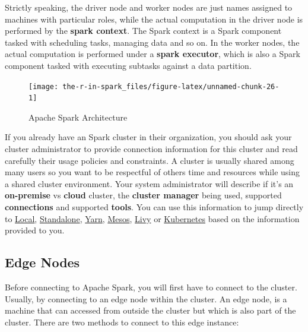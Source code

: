 \documentclass[]{book}
\theoremstyle{definition}
\theoremstyle{definition}
\theoremstyle{definition}
\theoremstyle{remark}
\begin{document}
Strictly speaking, the driver node and worker nodes are just names
assigned to machines with particular roles, while the actual computation
in the driver node is performed by the \textbf{spark context}. The Spark
context is a Spark component tasked with scheduling tasks, managing data
and so on. In the worker nodes, the actual computation is performed
under a \textbf{spark executor}, which is also a Spark component tasked
with executing subtasks against a data partition.

\begin{figure}

{\centering \texttt{[image: the-r-in-spark\_files/figure-latex/unnamed-chunk-26-1]} 

}

\caption{Apache Spark Architecture}\label{fig:unnamed-chunk-26}
\end{figure}

If you already have an Spark cluster in their organization, you should
ask your cluster administrator to provide connection information for
this cluster and read carefully their usage policies and constraints. A
cluster is usually shared among many users so you want to be respectful
of others time and resources while using a shared cluster environment.
Your system administrator will describe if it's an \textbf{on-premise}
vs \textbf{cloud} cluster, the \textbf{cluster manager} being used,
supported \textbf{connections} and supported \textbf{tools}. You can use
this information to jump directly to \protect\hyperlink{local}{Local},
\protect\hyperlink{standalone}{Standalone},
\protect\hyperlink{yarn-1}{Yarn}, \protect\hyperlink{mesos-1}{Mesos},
\protect\hyperlink{livy}{Livy} or
\protect\hyperlink{kubernetes-1}{Kubernetes} based on the information
provided to you.

\hypertarget{edge-nodes}{%
\subsection{Edge Nodes}\label{edge-nodes}}

Before connecting to Apache Spark, you will first have to connect to the
cluster. Usually, by connecting to an edge node within the cluster. An
edge node, is a machine that can accessed from outside the cluster but
which is also part of the cluster. There are two methods to connect to
this edge instance:
\end{document}
